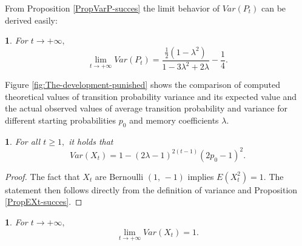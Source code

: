 \documentclass{amsart}
\theoremstyle{definition}
\theoremstyle{plain}
\newtheorem{prop}[thm]{\protect\propositionname}
\theoremstyle{plain}
\newtheorem{cor}[thm]{\protect\corollaryname}
\theoremstyle{plain}
\numberwithin{equation}{section}
\providecommand{\corollaryname}{Corollary}
\providecommand{\propositionname}{Proposition}
\begin{document}
From Proposition \ref{PropVarP-succes} the limit behavior of $Var(P_{t})$
can be derived easily:

\begin{cor}
For $t\rightarrow+\infty,$ \textup{
\begin{equation}
\lim_{t\to+\infty}Var(P_{t})=\frac{\frac{1}{2}(1-\lambda^{2})}{1-3\lambda^{2}+2\lambda}-\frac{1}{4}.\label{eq:CoroVarpt-statement}
\end{equation}
}
\end{cor}

Figure \ref{fig:The-development-punished} shows the comparison of
computed theoretical values of transition probability variance and
its expected value and the actual observed values of average transition
probability and variance for different starting probabilities $p_{0}$
and memory coefficients $\lambda$.


\begin{prop}\label{propVarX}
For all $t\geq1,$ it holds that
\begin{equation}
Var(X_{t})=1-(2\lambda-1)^{2(t-1)}(2p_{0}-1)^2.
\end{equation}
\end{prop}
\begin{proof}
The fact that $X_t$ are Bernoulli $(1,\,-1)$ implies $E(X_{t}^2)=1$. The statement then follows directly from the definition of variance and Proposition \ref{PropEXt-succes}.
\end{proof}


\begin{cor}
For $t\rightarrow+\infty,$ \textup{
\begin{equation}
\lim_{t\to+\infty}Var(X_{t})=1.
\end{equation}
}
\end{cor}
\end{document}
